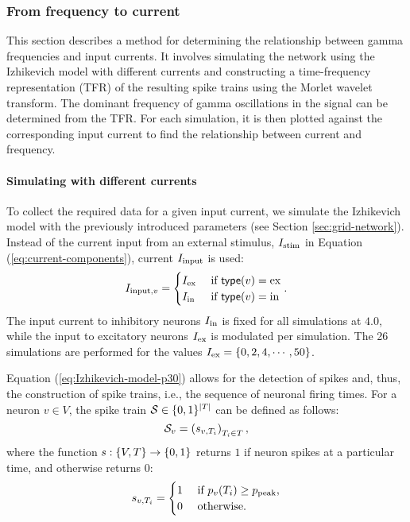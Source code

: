 \subsubsection{From frequency to current}

This section describes a method for determining the relationship between gamma frequencies and input currents. It involves simulating the network using the Izhikevich model with different currents and constructing a time-frequency representation (TFR) of the resulting spike trains using the Morlet wavelet transform. The dominant frequency of gamma oscillations in the signal can be determined from the TFR. For each simulation, it is then plotted against the corresponding input current to find the relationship between current and frequency.

\paragraph{Simulating with different currents}

To collect the required data for a given input current, we simulate the Izhikevich model with the previously introduced parameters (see Section \ref{sec:grid-network}). Instead of the current input from an external stimulus, $I_{\mathrm{stim}}$ in Equation (\ref{eq:current-components}), current $I_{\mathrm{input}}$ is used:
\begin{equation}
    I_{\mathrm{input}, v} = \begin{cases}
        I_{\mathrm{ex}} & \text{ if } \mathsf{type}(v) = \mathrm{ex} \\
        I_{\mathrm{in}} & \text{ if } \mathsf{type}(v) = \mathrm{in}
    \end{cases}.
\end{equation}
The input current to inhibitory neurons $I_{\mathrm{in}}$ is fixed for all simulations at $4.0$, while the input to excitatory neurons $I_{\mathrm{ex}}$ is modulated per simulation. The 26 simulations are performed for the values $I_{\mathrm{ex}} = \{ 0, 2, 4, \cdots, 50 \}$.

Equation (\ref{eq:Izhikevich-model-p30}) allows for the detection of spikes and, thus, the construction of spike trains, i.e., the sequence of neuronal firing times. For a neuron $v \in V$, the spike train $\mathcal{S} \in \{0, 1\}^{|T|}$ can be defined as follows:
\begin{equation}
    \mathcal{S}_v = 
    \left( 
        s_{v, T_i}
    \right)_{T_i \in T},
\end{equation}
where the function $s: \{V, T\} \to \{0, 1\}$ returns $1$ if neuron spikes at a particular time, and otherwise returns $0$:
\begin{equation}
    s_{v, T_i} = \begin{cases}
        1 &\text{ if } p_v(T_i) \geq p_{\mathrm{peak}}
        , \\
        0 &\text{ otherwise}.
    \end{cases}
\end{equation}

